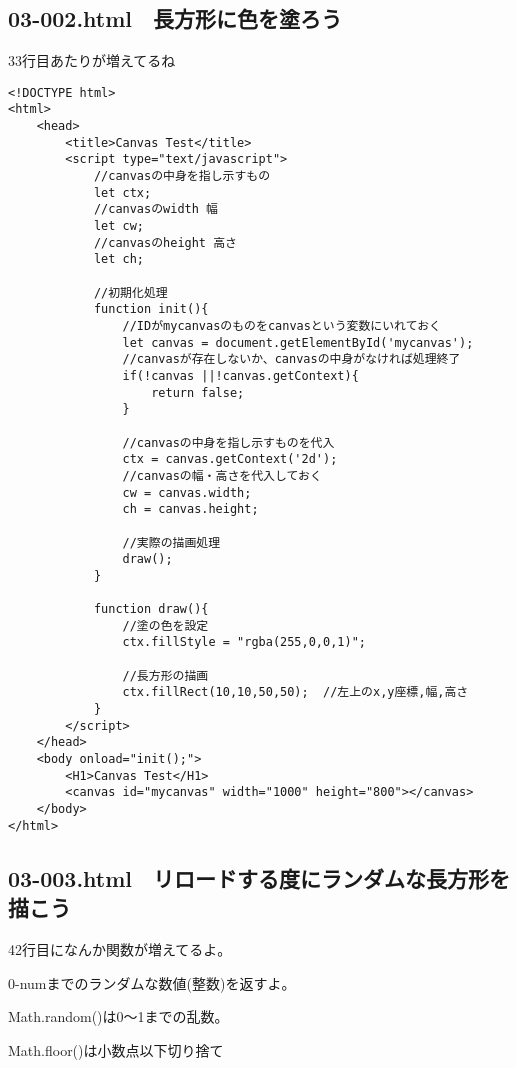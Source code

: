\documentclass[mingoth,11pt,a4j,uplatex]{jsarticle}
\begin{document}
\subsection{03-002.html　長方形に色を塗ろう}
33行目あたりが増えてるね
\begin{lstlisting}[caption=長方形に色を塗ろう]
<!DOCTYPE html>
<html>
	<head>
		<title>Canvas Test</title>
		<script type="text/javascript">
			//canvasの中身を指し示すもの
			let ctx;
			//canvasのwidth 幅
			let cw;
			//canvasのheight 高さ
			let ch;
			
			//初期化処理
			function init(){
				//IDがmycanvasのものをcanvasという変数にいれておく
				let canvas = document.getElementById('mycanvas');
				//canvasが存在しないか、canvasの中身がなければ処理終了
				if(!canvas ||!canvas.getContext){
					return false;
				}
				
				//canvasの中身を指し示すものを代入
				ctx = canvas.getContext('2d');
				//canvasの幅・高さを代入しておく
				cw = canvas.width;
				ch = canvas.height;
				
				//実際の描画処理
				draw();
			}
			
			function draw(){
				//塗の色を設定
				ctx.fillStyle = "rgba(255,0,0,1)";
				
				//長方形の描画
				ctx.fillRect(10,10,50,50);	//左上のx,y座標,幅,高さ
			}
		</script>
	</head>
	<body onload="init();">
		<H1>Canvas Test</H1>
		<canvas id="mycanvas" width="1000" height="800"></canvas>
	</body>
</html>
\end{lstlisting}

\subsection{03-003.html　リロードする度にランダムな長方形を描こう}
42行目になんか関数が増えてるよ。

0-numまでのランダムな数値(整数)を返すよ。

Math.random()は0〜1までの乱数。

Math.floor()は小数点以下切り捨て
\end{document}
